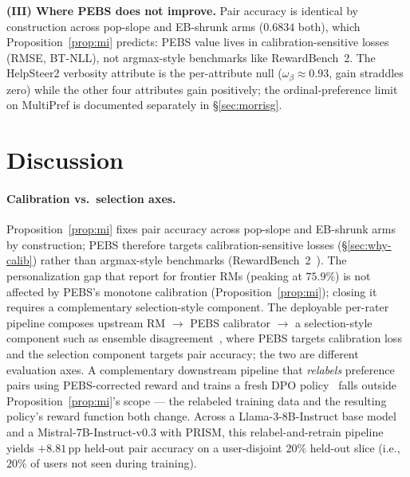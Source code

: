 \documentclass{article}
\newcommand{\PEBS}{\textsc{PEBS}}
\begin{document}
\textbf{(III) Where PEBS does not improve.} Pair accuracy is
identical by construction across pop-slope and EB-shrunk arms
($0.6834$ both), which Proposition~\ref{prop:mi} predicts: PEBS
value lives in calibration-sensitive losses (RMSE, BT-NLL), not
argmax-style benchmarks like RewardBench~2. The HelpSteer2
verbosity attribute is the per-attribute null
($\omega_\beta\!\approx\!0.93$, gain straddles zero) while the
other four attributes gain positively;
the ordinal-preference limit on MultiPref is documented
separately in \S\ref{sec:morrisg}.

\section{Discussion}\label{sec:discussion}

\paragraph{Calibration vs.\ selection axes.}
Proposition~\ref{prop:mi} fixes pair accuracy across pop-slope and
EB-shrunk arms by construction; PEBS therefore targets
calibration-sensitive losses (\S\ref{sec:why-calib}) rather than
argmax-style benchmarks
(RewardBench~2~\citep{lambert2024rewardbench}). The
personalization gap that \citet{ma2026personalizedrb} report for
frontier RMs (peaking at $75.9\%$)
is not affected by PEBS's monotone calibration
(Proposition~\ref{prop:mi}); closing it requires a complementary selection-style
component. The deployable per-rater pipeline composes upstream
RM $\to$ \PEBS{} calibrator $\to$ a selection-style component
such as ensemble disagreement~\citep{coste2024reward},
where PEBS targets calibration loss and the selection component
targets pair accuracy; the two are different evaluation axes. A
complementary downstream pipeline that \emph{relabels} preference
pairs using PEBS-corrected reward and trains a fresh DPO
policy~\citep{rafailov2023direct} falls outside
Proposition~\ref{prop:mi}'s scope --- the relabeled training data
and the resulting policy's reward function both change. Across a
Llama-3-8B-Instruct base model and a Mistral-7B-Instruct-v0.3 with PRISM, this relabel-and-retrain
pipeline yields $+8.81$\,pp held-out pair accuracy on a
user-disjoint $20\%$ held-out slice (i.e., $20\%$ of users not seen
during training).
\end{document}
